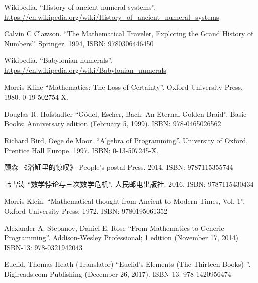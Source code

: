 \documentclass{article}
\begin{document}
\fi



\begin{thebibliography}{99}


Wikipedia. ``History of ancient numeral systems''. \url{https://en.wikipedia.org/wiki/History_of_ancient_numeral_systems}

Calvin C Clawson. ``The Mathematical Traveler, Exploring the Grand History of Numbers''. Springer. 1994, ISBN: 9780306446450

Wikipedia. ``Babylonian numerals''. \url{https://en.wikipedia.org/wiki/Babylonian_numerals}

Morris Kline ``Mathematics: The Loss of Certainty''. Oxford University Press, 1980. 0-19-502754-X.

Douglas R. Hofstadter ``Gödel, Escher, Bach: An Eternal Golden Braid''. Basic Books; Anniversary edition (February 5, 1999). ISBN: 978-0465026562

Richard Bird, Oege de Moor. ``Algebra of Programming''. University of Oxford, Prentice Hall Europe. 1997. ISBN: 0-13-507245-X.

{\fontspec{\cnmainft}顾森 《浴缸里的惊叹》} People's postal Press. 2014, ISBN: 9787115355744


{\fontspec{\cnmainft}韩雪涛 ``数学悖论与三次数学危机''. 人民邮电出版社. 2016, ISBN: 9787115430434}

Morris Klein. ``Mathematical thought from Ancient to Modern Times, Vol. 1''. Oxford University Press; 1972. ISBN: 9780195061352

Alexander A. Stepanov, Daniel E. Rose ``From Mathematics to Generic Programming''. Addison-Wesley Professional; 1 edition (November 17, 2014) ISBN-13: 978-0321942043

Euclid, Thomas Heath (Translator) ``Euclid's Elements (The Thirteen Books) ''. Digireads.com Publishing (December 26, 2017). ISBN-13: 978-1420956474


\end{thebibliography}
\end{document}
